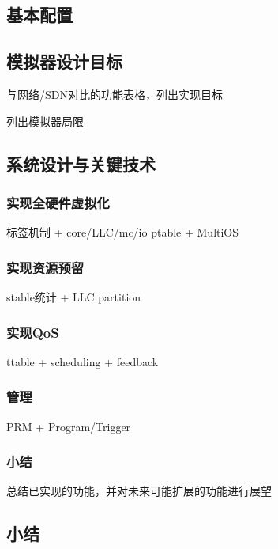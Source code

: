 \subsection{基本配置}

\subsection{模拟器设计目标}

与网络/SDN对比的功能表格，列出实现目标

列出模拟器局限

\subsection{系统设计与关键技术}

\subsubsection{实现全硬件虚拟化}

标签机制 + core/LLC/mc/io
ptable + MultiOS

\subsubsection{实现资源预留}

stable统计 + LLC partition

\subsubsection{实现QoS}

ttable + scheduling + feedback

\subsubsection{管理}

PRM + Program/Trigger

\subsubsection{小结}

总结已实现的功能，并对未来可能扩展的功能进行展望

\subsection{小结}

\fi

